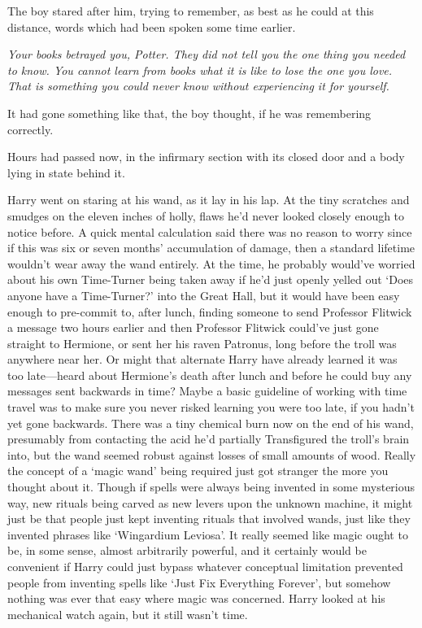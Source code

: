 The boy stared after him, trying to remember, as best as he could at this distance, words which had been spoken some time earlier.

\emph{Your books betrayed you, Potter. They did not tell you the one thing you needed to know. You cannot learn from books what it is like to lose the one you love. That is something you could never know without experiencing it for yourself.}

It had gone something like that, the boy thought, if he was remembering correctly.

\later

Hours had passed now, in the infirmary section with its closed door and a body lying in state behind it.

Harry went on staring at his wand, as it lay in his lap. At the tiny scratches and smudges on the eleven inches of holly, flaws he'd never looked closely enough to notice before. A quick mental calculation said there was no reason to worry since if this was six or seven months' accumulation of damage, then a standard lifetime wouldn't wear away the wand entirely. At the time, he probably would've worried about his own Time-Turner being taken away if he'd just openly yelled out `Does anyone have a Time-Turner?' into the Great Hall, but it would have been easy enough to pre-commit to, after lunch, finding someone to send Professor Flitwick a message two hours earlier and then Professor Flitwick could've just gone straight to Hermione, or sent her his raven Patronus, long before the troll was anywhere near her. Or might that alternate Harry have already learned it was too late—heard about Hermione's death after lunch and before he could buy any messages sent backwards in time? Maybe a basic guideline of working with time travel was to make sure you never risked learning you were too late, if you hadn't yet gone backwards. There was a tiny chemical burn now on the end of his wand, presumably from contacting the acid he'd partially Transfigured the troll's brain into, but the wand seemed robust against losses of small amounts of wood. Really the concept of a `magic wand' being required just got stranger the more you thought about it. Though if spells were always being invented in some mysterious way, new rituals being carved as new levers upon the unknown machine, it might just be that people just kept inventing rituals that involved wands, just like they invented phrases like `Wingardium Leviosa'. It really seemed like magic ought to be, in some sense, almost arbitrarily powerful, and it certainly would be convenient if Harry could just bypass whatever conceptual limitation prevented people from inventing spells like `Just Fix Everything Forever', but somehow nothing was ever that easy where magic was concerned. Harry looked at his mechanical watch again, but it still wasn't time.

